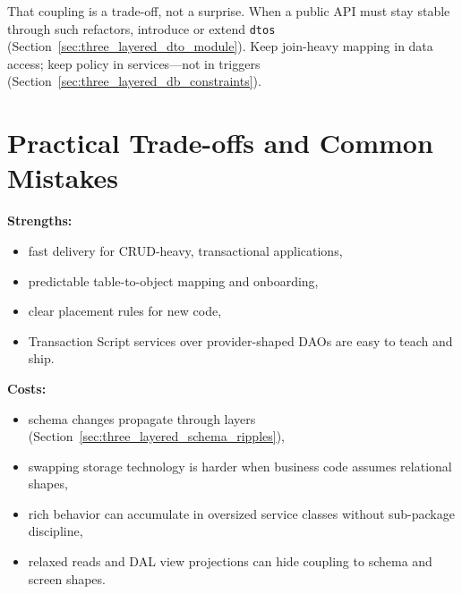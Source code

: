 That coupling is a trade-off, not a surprise. When a public API must stay stable through such refactors, introduce or extend \texttt{dtos} (Section~\ref{sec:three_layered_dto_module}). Keep join-heavy mapping in data access; keep policy in services---not in triggers (Section~\ref{sec:three_layered_db_constraints}).

\section{Practical Trade-offs and Common Mistakes}
\label{sec:three_layered_tradeoffs}

\textbf{Strengths:}\autocite{microsoft2003layered}
\begin{itemize}
    \item fast delivery for CRUD-heavy, transactional applications,
    \item predictable table-to-object mapping and onboarding,
    \item clear placement rules for new code,
    \item Transaction Script services over provider-shaped DAOs are easy to teach and ship.\autocite{fowler2002patterns}
\end{itemize}

\textbf{Costs:}
\begin{itemize}
    \item schema changes propagate through layers (Section~\ref{sec:three_layered_schema_ripples}),
    \item swapping storage technology is harder when business code assumes relational shapes,
    \item rich behavior can accumulate in oversized service classes without sub-package discipline,
    \item relaxed reads and DAL view projections can hide coupling to schema and screen shapes.
\end{itemize}

